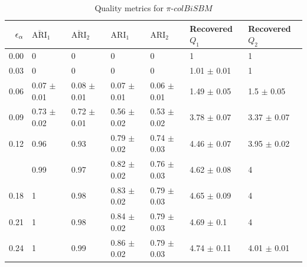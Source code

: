 \begin{table}[!h]

\caption{\label{tab:per_model_table}\label{tab:per_model_pi}Quality metrics for $\pi$$\text{-}colBiSBM$}
\centering
\begin{tabular}[t]{rllllll}
\toprule
$\eps[\alpha]$ & $\overline{\text{ARI}}_{1}$ & $\overline{\text{ARI}}_{2}$ & $\text{ARI}_{1}$ & $\text{ARI}_{2}$ & Recovered $Q_1$ & Recovered $Q_2$\\
\midrule
0.00 & 0 & 0 & 0 & 0 & 1 & 1\\
0.03 & 0 & 0 & 0 & 0 & 1.01 $\pm$ 0.01 & 1\\
0.06 & 0.07 $\pm$ 0.01 & 0.08 $\pm$ 0.01 & 0.07 $\pm$ 0.01 & 0.06 $\pm$ 0.01 & 1.49 $\pm$ 0.05 & 1.5 $\pm$ 0.05\\
0.09 & 0.73 $\pm$ 0.02 & 0.72 $\pm$ 0.01 & 0.56 $\pm$ 0.02 & 0.53 $\pm$ 0.02 & 3.78 $\pm$ 0.07 & 3.37 $\pm$ 0.07\\
0.12 & 0.96 & 0.93 & 0.79 $\pm$ 0.02 & 0.74 $\pm$ 0.03 & 4.46 $\pm$ 0.07 & 3.95 $\pm$ 0.02\\
\addlinespace
0.15 & 0.99 & 0.97 & 0.82 $\pm$ 0.02 & 0.76 $\pm$ 0.03 & 4.62 $\pm$ 0.08 & 4\\
0.18 & 1 & 0.98 & 0.83 $\pm$ 0.02 & 0.79 $\pm$ 0.03 & 4.65 $\pm$ 0.09 & 4\\
0.21 & 1 & 0.98 & 0.84 $\pm$ 0.02 & 0.79 $\pm$ 0.03 & 4.69 $\pm$ 0.1 & 4\\
0.24 & 1 & 0.99 & 0.86 $\pm$ 0.02 & 0.79 $\pm$ 0.03 & 4.74 $\pm$ 0.11 & 4.01 $\pm$ 0.01\\
\bottomrule
\end{tabular}
\end{table}
